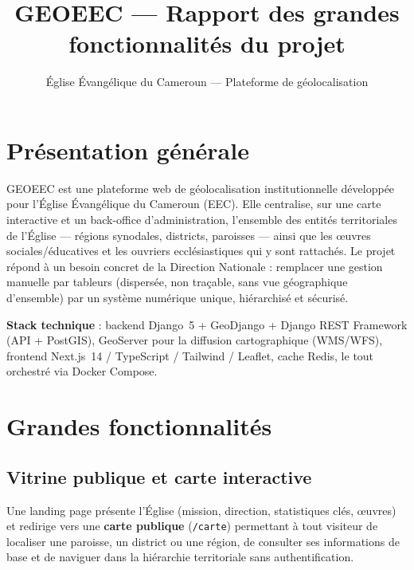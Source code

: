\documentclass[11pt, a4paper]{article}
\title{GEOEEC --- Rapport des grandes fonctionnalités du projet}
\author{Église Évangélique du Cameroun --- Plateforme de géolocalisation}
\date{}
\begin{document}
\maketitle
\thispagestyle{fancy}
\vspace{-0.8cm}

\section*{Présentation générale}

GEOEEC est une plateforme web de géolocalisation institutionnelle développée pour l'Église
Évangélique du Cameroun (EEC). Elle centralise, sur une carte interactive et un back-office
d'administration, l'ensemble des entités territoriales de l'Église --- régions synodales,
districts, paroisses --- ainsi que les œuvres sociales/éducatives et les ouvriers ecclésiastiques
qui y sont rattachés. Le projet répond à un besoin concret de la Direction Nationale : remplacer
une gestion manuelle par tableurs (dispersée, non traçable, sans vue géographique d'ensemble)
par un système numérique unique, hiérarchisé et sécurisé.

\textbf{Stack technique} : backend Django~5 + GeoDjango + Django REST Framework (API + PostGIS),
GeoServer pour la diffusion cartographique (WMS/WFS), frontend Next.js~14 / TypeScript /
Tailwind / Leaflet, cache Redis, le tout orchestré via Docker Compose.

\section{Grandes fonctionnalités}

\subsection{Vitrine publique et carte interactive}
Une landing page présente l'Église (mission, direction, statistiques clés, œuvres) et
redirige vers une \textbf{carte publique} (\texttt{/carte}) permettant à tout visiteur de
localiser une paroisse, un district ou une région, de consulter ses informations de base et
de naviguer dans la hiérarchie territoriale sans authentification.
\end{document}

